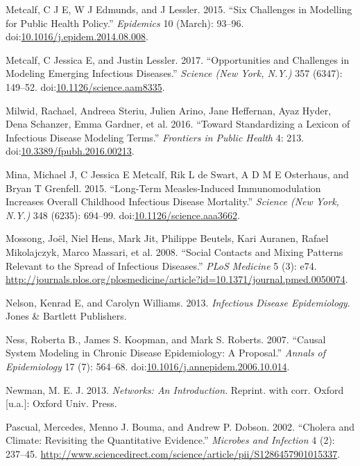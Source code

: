 \documentclass[]{book}
\theoremstyle{definition}
\theoremstyle{definition}
\theoremstyle{definition}
\theoremstyle{remark}
\begin{document}
\hypertarget{ref-metcalf15}{}
Metcalf, C J E, W J Edmunds, and J Lessler. 2015. ``Six Challenges in
Modelling for Public Health Policy.'' \emph{Epidemics} 10 (March):
93--96.
doi:\href{https://doi.org/10.1016/j.epidem.2014.08.008}{10.1016/j.epidem.2014.08.008}.

\hypertarget{ref-metcalf17}{}
Metcalf, C Jessica E, and Justin Lessler. 2017. ``Opportunities and
Challenges in Modeling Emerging Infectious Diseases.'' \emph{Science
(New York, N.Y.)} 357 (6347): 149--52.
doi:\href{https://doi.org/10.1126/science.aam8335}{10.1126/science.aam8335}.

\hypertarget{ref-milwid16}{}
Milwid, Rachael, Andreea Steriu, Julien Arino, Jane Heffernan, Ayaz
Hyder, Dena Schanzer, Emma Gardner, et al. 2016. ``Toward Standardizing
a Lexicon of Infectious Disease Modeling Terms.'' \emph{Frontiers in
Public Health} 4: 213.
doi:\href{https://doi.org/10.3389/fpubh.2016.00213}{10.3389/fpubh.2016.00213}.

\hypertarget{ref-mina15}{}
Mina, Michael J, C Jessica E Metcalf, Rik L de Swart, A D M E Osterhaus,
and Bryan T Grenfell. 2015. ``Long-Term Measles-Induced Immunomodulation
Increases Overall Childhood Infectious Disease Mortality.''
\emph{Science (New York, N.Y.)} 348 (6235): 694--99.
doi:\href{https://doi.org/10.1126/science.aaa3662}{10.1126/science.aaa3662}.

\hypertarget{ref-mossong08}{}
Mossong, Joël, Niel Hens, Mark Jit, Philippe Beutels, Kari Auranen,
Rafael Mikolajczyk, Marco Massari, et al. 2008. ``Social Contacts and
Mixing Patterns Relevant to the Spread of Infectious Diseases.''
\emph{PLoS Medicine} 5 (3): e74.
\url{http://journals.plos.org/plosmedicine/article?id=10.1371/journal.pmed.0050074}.

\hypertarget{ref-nelson13}{}
Nelson, Kenrad E, and Carolyn Williams. 2013. \emph{Infectious Disease
Epidemiology}. Jones \& Bartlett Publishers.

\hypertarget{ref-ness07}{}
Ness, Roberta B., James S. Koopman, and Mark S. Roberts. 2007. ``Causal
System Modeling in Chronic Disease Epidemiology: A Proposal.''
\emph{Annals of Epidemiology} 17 (7): 564--68.
doi:\href{https://doi.org/10.1016/j.annepidem.2006.10.014}{10.1016/j.annepidem.2006.10.014}.

\hypertarget{ref-newman13}{}
Newman, M. E. J. 2013. \emph{Networks: An Introduction}. Reprint. with
corr. Oxford {[}u.a.{]}: Oxford Univ. Press.

\hypertarget{ref-pascual02}{}
Pascual, Mercedes, Menno J. Bouma, and Andrew P. Dobson. 2002. ``Cholera
and Climate: Revisiting the Quantitative Evidence.'' \emph{Microbes and
Infection} 4 (2): 237--45.
\url{http://www.sciencedirect.com/science/article/pii/S1286457901015337}.
\end{document}
